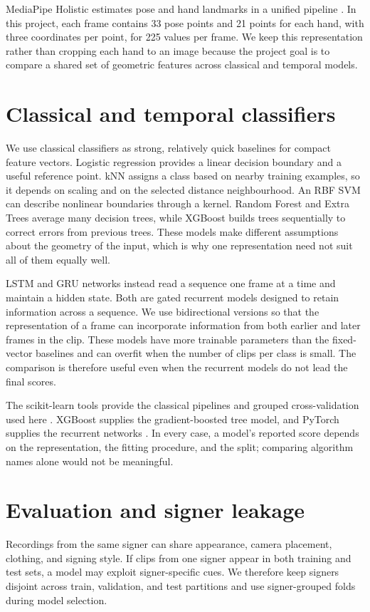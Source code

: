 \documentclass[12pt,a4paper,oneside]{report}
\begin{document}
MediaPipe Holistic estimates pose and hand landmarks in a unified pipeline \cite{mediapipe_holistic}. In this project, each frame contains 33 pose points and 21 points for each hand, with three coordinates per point, for 225 values per frame. We keep this representation rather than cropping each hand to an image because the project goal is to compare a shared set of geometric features across classical and temporal models.

\section{Classical and temporal classifiers}
We use classical classifiers as strong, relatively quick baselines for compact feature vectors. Logistic regression provides a linear decision boundary and a useful reference point. kNN assigns a class based on nearby training examples, so it depends on scaling and on the selected distance neighbourhood. An RBF SVM can describe nonlinear boundaries through a kernel. Random Forest and Extra Trees average many decision trees, while XGBoost builds trees sequentially to correct errors from previous trees. These models make different assumptions about the geometry of the input, which is why one representation need not suit all of them equally well.

LSTM and GRU networks instead read a sequence one frame at a time and maintain a hidden state. Both are gated recurrent models designed to retain information across a sequence. We use bidirectional versions so that the representation of a frame can incorporate information from both earlier and later frames in the clip. These models have more trainable parameters than the fixed-vector baselines and can overfit when the number of clips per class is small. The comparison is therefore useful even when the recurrent models do not lead the final scores.

The scikit-learn tools provide the classical pipelines and grouped cross-validation used here \cite{sklearn}. XGBoost supplies the gradient-boosted tree model, and PyTorch supplies the recurrent networks \cite{xgboost,pytorch}. In every case, a model's reported score depends on the representation, the fitting procedure, and the split; comparing algorithm names alone would not be meaningful.

\section{Evaluation and signer leakage}
Recordings from the same signer can share appearance, camera placement, clothing, and signing style. If clips from one signer appear in both training and test sets, a model may exploit signer-specific cues. We therefore keep signers disjoint across train, validation, and test partitions and use signer-grouped folds during model selection.
\end{document}
